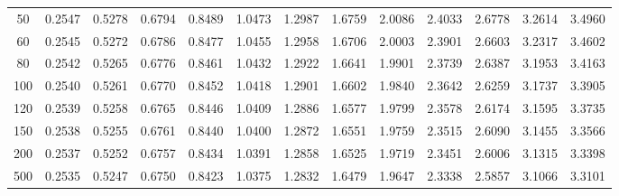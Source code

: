 \begin{table}[htbp]
\begin{tabular}{ccccccccccccc}
		50 & 0.2547 & 0.5278 & 0.6794 & 0.8489 & 1.0473 & 1.2987 & 1.6759 & 2.0086 & 2.4033 & 2.6778 & 3.2614 & 3.4960 \\
		60 & 0.2545 & 0.5272 & 0.6786 & 0.8477 & 1.0455 & 1.2958 & 1.6706 & 2.0003 & 2.3901 & 2.6603 & 3.2317 & 3.4602 \\
		80 & 0.2542 & 0.5265 & 0.6776 & 0.8461 & 1.0432 & 1.2922 & 1.6641 & 1.9901 & 2.3739 & 2.6387 & 3.1953 & 3.4163 \\
		100 & 0.2540 & 0.5261 & 0.6770 & 0.8452 & 1.0418 & 1.2901 & 1.6602 & 1.9840 & 2.3642 & 2.6259 & 3.1737 & 3.3905 \\
		120 & 0.2539 & 0.5258 & 0.6765 & 0.8446 & 1.0409 & 1.2886 & 1.6577 & 1.9799 & 2.3578 & 2.6174 & 3.1595 & 3.3735 \\
		150 & 0.2538 & 0.5255 & 0.6761 & 0.8440 & 1.0400 & 1.2872 & 1.6551 & 1.9759 & 2.3515 & 2.6090 & 3.1455 & 3.3566 \\
		200 & 0.2537 & 0.5252 & 0.6757 & 0.8434 & 1.0391 & 1.2858 & 1.6525 & 1.9719 & 2.3451 & 2.6006 & 3.1315 & 3.3398 \\
		500 & 0.2535 & 0.5247 & 0.6750 & 0.8423 & 1.0375 & 1.2832 & 1.6479 & 1.9647 & 2.3338 & 2.5857 & 3.1066 & 3.3101 \\
		\hline
	\end{tabular}
\end{table}
